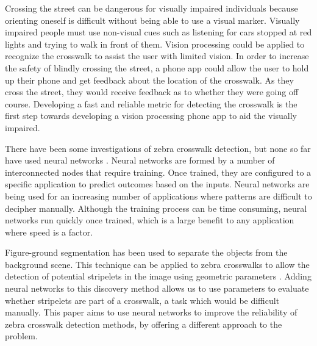 \documentclass[12pt]{ucthesis}
\begin{document}
Crossing the street can be dangerous for visually impaired individuals because orienting oneself is difficult without being able to use a visual marker. Visually impaired people must use non-visual cues such as listening for cars stopped at red lights and trying to walk in front of them. Vision processing could be applied to recognize the crosswalk to assist the user with limited vision. In order to increase the safety of blindly crossing the street, a phone app could allow the user to hold up their phone and get feedback about the location of the crosswalk. As they cross the street, they would receive feedback as to whether they were going off course. Developing a fast and reliable metric for detecting the crosswalk is the first step towards developing a vision processing phone app to aid the visually impaired.

There have been some investigations of zebra crosswalk detection, but none so far have used neural networks \cite{Coughlan2006}\cite{ZebraPhone}\cite{relatedworkbipolarity}. Neural networks are formed by a number of interconnected nodes that require training. Once trained, they are configured to a specific application to predict outcomes based on the inputs. Neural networks are being used for an increasing number of applications where patterns are difficult to decipher manually. Although the training process can be time consuming, neural networks run quickly once trained, which is a large benefit to any application where speed is a factor. 

Figure-ground segmentation has been used to separate the objects from the background scene. This technique can be applied to zebra crosswalks to allow the detection of potential stripelets in the image using geometric parameters \cite{Coughlan2006}. Adding neural networks to this discovery method allows us to use parameters to evaluate whether stripelets are part of a crosswalk, a task which would be difficult manually. This paper aims to use neural networks to improve the reliability of zebra crosswalk detection methods, by offering a different approach to the problem.


\end{document}
